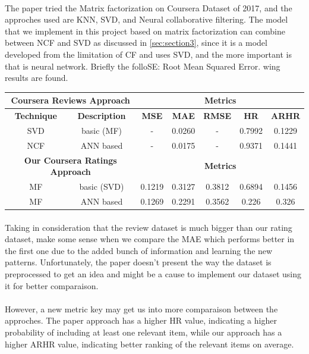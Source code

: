 \documentclass{cup-pan}
\begin{document}
\paragraph{}
The paper tried the Matrix factorization on Coursera Dataset of 2017, and the approches used are KNN, SVD, and Neural collaborative filtering. The model that we implement in this project based on matrix factorization can combine between NCF and SVD as discussed in \ref{sec:section3}, since it is a model developed from the limitation of CF and uses SVD, and the more important is that is neural network. Briefly the folloSE: Root Mean Squared Error. wing results are found.
\begin{center} 
  \begin{tabular}{||c|c||c|c|c|c|c||}
    \hline\hline 
    \multicolumn{2}{||c||}{\textbf{Coursera Reviews Approach}} & \multicolumn{5}{c||}{\textbf{Metrics}} \\
    \hline
    \textbf{Technique} & \textbf{Description} & \textbf{MSE} & \textbf{MAE} & \textbf{RMSE} & \textbf{HR} & \textbf{ARHR} \\
    \hline 
    SVD  & basic (MF) & - & 0.0260 & - & 0.7992 & 0.1229 \\
    NCF & ANN based & - & 0.0175 & - & 0.9371 & 0.1441 \\
    \hline\hline
    \multicolumn{2}{||c||}{\textbf{Our Coursera Ratings Approach}} & \multicolumn{5}{c||}{\textbf{Metrics}} \\
    \hline
    MF & basic (SVD) & 0.1219 & 0.3127 & 0.3812 & 0.6894 & 0.1456 \\
    MF & ANN based & 0.1269 & 0.2291 & 0.3562 & 0.226 & 0.326 \\
    \hline\hline
  \end{tabular}
\end{center}
\paragraph{}
Taking in consideration that the review dataset is much bigger than our rating dataset, make some sense when we compare the MAE which performs better in the first one due to the added bunch of information and learning the new patterns. Unfortunately, the paper doesn't present the way the dataset is preprocessed to get an idea and might be a cause to implement our dataset using it for better comparaison.
\paragraph{}
However, a new metric key may get us into more comparaison between the approches. The paper approach has a higher HR value, indicating a higher probability of including at least one relevant item, while our approach has a higher ARHR value, indicating better ranking of the relevant items on average.
\end{document}
